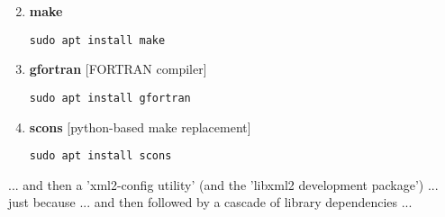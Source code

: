 \documentclass[10pt,twoside]{article}
\begin{document}
\begin{enumerate}[noitemsep]
\setcounter{enumi}{1}

\item \textbf{make}
\vspace{-2pt}
\begin{verbatim}
sudo apt install make
\end{verbatim}

\vspace{4pt}
\item \textbf{gfortran} [FORTRAN compiler]
\vspace{-2pt}
\begin{verbatim}
sudo apt install gfortran
\end{verbatim}

\item \textbf{scons} [python-based make replacement]
\vspace{-2pt}
\begin{verbatim}
sudo apt install scons
\end{verbatim}

\end{enumerate}

... and then a 'xml2-config utility' (and the 'libxml2 development package') ... just because ... and then followed by a cascade of library dependencies ...
\end{document}

